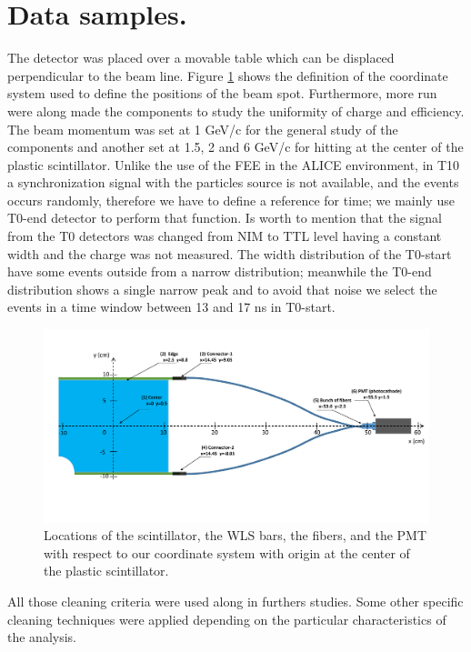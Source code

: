 \section{Data samples.} \label{section:Data_samples}

	The detector was placed over a movable table which can be 
	displaced perpendicular to the beam line. Figure \ref{figure:zones} shows the definition of the coordinate system used to define the positions of the beam spot. 
	Furthermore, more run were along made the components to study the 
	uniformity of charge and efficiency.
	The beam momentum was set at 1 GeV/c for the general study of the
	components
	and another set at 1.5, 2 and 6 GeV/c for hitting at the center of the 
	plastic scintillator.
	Unlike the use of the FEE in the ALICE environment, in T10 a 
	synchronization signal with the particles source 
	is not available, and the events occurs randomly, therefore we have to 
	define a reference for time; we mainly use T0-end detector to perform that 
	function. %
	Is worth to mention that the signal from the T0 detectors was changed from NIM to TTL level having a constant width and the charge was not measured. %
	The	width distribution of the T0-start have some events outside from a narrow distribution; meanwhile the T0-end distribution
	shows a single narrow peak and to avoid that noise we select the events in a time window between 13 and 17 ns in T0-start. %
	
	\begin{figure}[ht!]
		\begin{center}
			\includegraphics[scale=0.40]{./images/AD-2DNIM.pdf}
			\caption{
			Locations of the scintillator, the WLS bars, the fibers, and
				the PMT with respect to our coordinate system with origin at the center of the plastic scintillator.
			}
			\label{figure:zones}
		\end{center}
	\end{figure}

All those cleaning criteria were used along in furthers studies. Some other specific cleaning techniques
were applied depending on the particular characteristics of the analysis.
